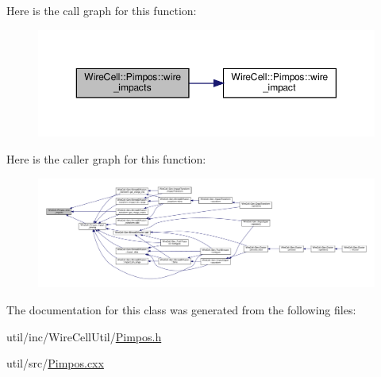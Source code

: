 Here is the call graph for this function\+:
\nopagebreak
\begin{figure}[H]
\begin{center}
\leavevmode
\includegraphics[width=350pt]{class_wire_cell_1_1_pimpos_a185f13fbfd5be1350fe5ba268f7557ca_cgraph}
\end{center}
\end{figure}
Here is the caller graph for this function\+:
\nopagebreak
\begin{figure}[H]
\begin{center}
\leavevmode
\includegraphics[width=350pt]{class_wire_cell_1_1_pimpos_a185f13fbfd5be1350fe5ba268f7557ca_icgraph}
\end{center}
\end{figure}


The documentation for this class was generated from the following files\+:\begin{DoxyCompactItemize}
\item 
util/inc/\+Wire\+Cell\+Util/\hyperlink{_pimpos_8h}{Pimpos.\+h}\item 
util/src/\hyperlink{_pimpos_8cxx}{Pimpos.\+cxx}\end{DoxyCompactItemize}
